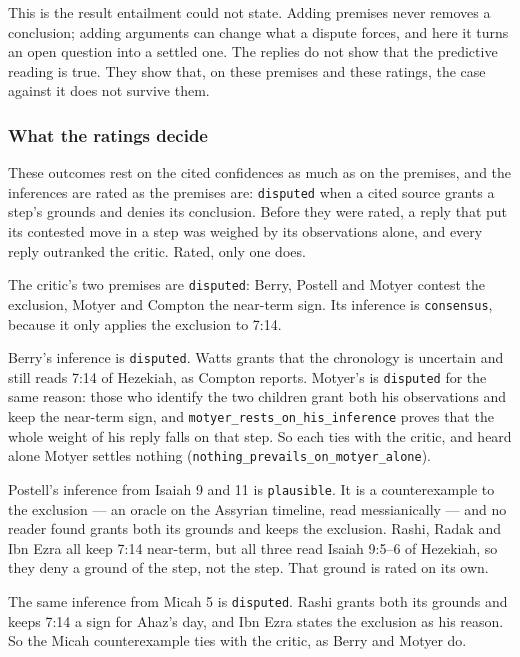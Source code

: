 \documentclass[11pt]{article}
\begin{document}
This is the result entailment could not state. Adding premises never removes a conclusion; adding arguments can change what a dispute forces, and here it turns an open question into a settled one. The replies do not show that the predictive reading is true. They show that, on these premises and these ratings, the case against it does not survive them.

\subsubsection*{What the ratings decide}
These outcomes rest on the cited confidences as much as on the premises, and the inferences are rated as the premises are: \texttt{disputed} when a cited source grants a step’s grounds and denies its conclusion. Before they were rated, a reply that put its contested move in a step was weighed by its observations alone, and every reply outranked the critic. Rated, only one does.

The critic’s two premises are \texttt{disputed}: Berry, Postell and Motyer contest the exclusion, Motyer and Compton the near-term sign. Its inference is \texttt{consensus}, because it only applies the exclusion to 7:14.

Berry’s inference is \texttt{disputed}. Watts grants that the chronology is uncertain and still reads 7:14 of Hezekiah, as Compton reports. Motyer’s is \texttt{disputed} for the same reason: those who identify the two children grant both his observations and keep the near-term sign, and \texttt{motyer\_\allowbreak{}rests\_\allowbreak{}on\_\allowbreak{}his\_\allowbreak{}inference} proves that the whole weight of his reply falls on that step. So each ties with the critic, and heard alone Motyer settles nothing (\texttt{nothing\_\allowbreak{}prevails\_\allowbreak{}on\_\allowbreak{}motyer\_\allowbreak{}alone}).

Postell’s inference from Isaiah 9 and 11 is \texttt{plausible}. It is a counterexample to the exclusion — an oracle on the Assyrian timeline, read messianically — and no reader found grants both its grounds and keeps the exclusion. Rashi, Radak and Ibn Ezra all keep 7:14 near-term, but all three read Isaiah 9:5–6 of Hezekiah, so they deny a ground of the step, not the step. That ground is rated on its own.

The same inference from Micah 5 is \texttt{disputed}. Rashi grants both its grounds and keeps 7:14 a sign for Ahaz’s day, and Ibn Ezra states the exclusion as his reason. So the Micah counterexample ties with the critic, as Berry and Motyer do.
\end{document}
